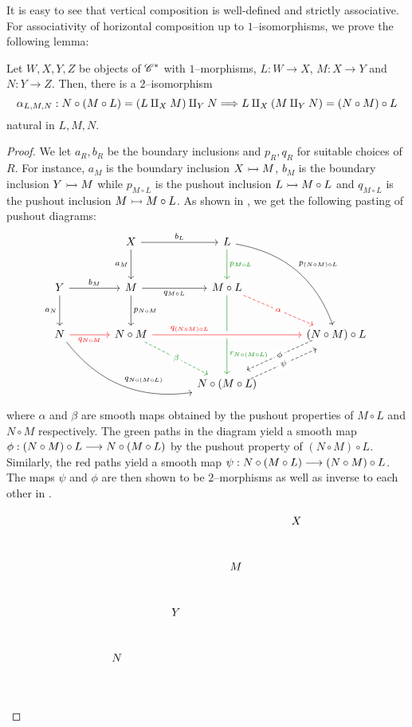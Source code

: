 \documentclass[./Thick_TQFTs_and_Quantum_Information.tex]{subfiles}
\begin{document}
It is easy to see that vertical composition is well-defined and strictly
associative. For associativity of horizontal composition up to
$1$--isomorphisms, we prove the following lemma:
\begin{lem}
Let $W, X, Y, Z$ be objects of $\mathscr{C}^*$ with $1$--morphisms, $L : W \to X$,
$M : X \to Y$ and $N : Y \to Z$. Then, there is a $2$--isomorphism
\[
  \alpha_{L, M, N}
  : N \circ (M \circ L) = (L \amalg_X M) \amalg_Y N
  \stackrel{}{\Longrightarrow} L \amalg_X (M \amalg_Y N) = (N \circ M) \circ L
\]
natural in $L, M, N$.
\end{lem}
\begin{proof}
We let $a_R, b_R$ be the boundary inclusions and $p_R, q_R$ for suitable
choices of $R$. For instance, $a_M$ is the boundary inclusion $X \stackrel{}{\rightarrowtail} M$,
$b_M$ is the boundary inclusion $Y \stackrel{}{\rightarrowtail} M$ while $p_{M \circ L}$ is the
pushout inclusion $L \stackrel{}{\rightarrowtail} M \circ L$ and $q_{M \circ L}$ is the pushout
inclusion $M \stackrel{}{\rightarrowtail} M \circ L$. As shown in \cite{Mahmud2021}, we get the
following pasting of pushout diagrams:
\[\begin{tikzcd}[column sep=large, row sep=large]
  & X \arrow[r, "b_{L}" above] \arrow[d, "a_{M}" left]
  & L \arrow[d, green!55!black, "p_{M \circ L}" right]
      \arrow[rdd, bend left, "p_{(N \circ M) \circ L}"] \\
  Y \arrow[r, "b_{M}" above] \arrow[d, "a_{N}" left]
  & M \arrow[r, "q_{M \circ L}" below] \arrow[d, "p_{N \circ M}" right]
  & M \circ L \arrow[dd, green!55!black, near end, "r_{N \circ (M \circ L)}"]
      \arrow[rd, dashed, red, "\alpha" description]\\
  N \arrow[r, red, "q_{N \circ M}" below]
    \arrow[rrd, bend right, "q_{N \circ (M \circ L)}"]
  & N \circ M
      \arrow[rr, near start, crossing over, red, "q_{(N \circ M) \circ L}"]
      \arrow[rd, dashed, green!55!black, "\beta" description]
  &
  & (N \circ M) \circ L
      \arrow[dl, dashed, shift right=1ex, "\phi" description] \\
  & & N \circ (M \circ L)
      \arrow[ur, dashed, shift right=1ex, "\psi" description] &
\end{tikzcd}\]
where $\alpha$ and $\beta$ are smooth maps obtained by the pushout properties
of $M \circ L$ and $N \circ M$ respectively. The green paths in the diagram
yield a smooth map $\phi : (N \circ M) \circ L \stackrel{}{\longrightarrow} N \circ (M \circ L)$ by the
pushout property of $(N \circ M) \circ L$. Similarly, the red paths yield a
smooth map $\psi : N \circ (M \circ L) \stackrel{}{\longrightarrow} (N \circ M) \circ L$. The maps
$\psi$ and $\phi$ are then shown to be $2$--morphisms as well as inverse to
each other in \cite{Mahmud2021}.

\begin{small}
\[\begin{tikzcd}[column sep=large, row sep=large]
  &   &   & X \\
  &   & M &   \\
  & Y &   &   \\
N &   &   &   \\
\end{tikzcd}\]
\end{small}

\end{proof}
\end{document}
